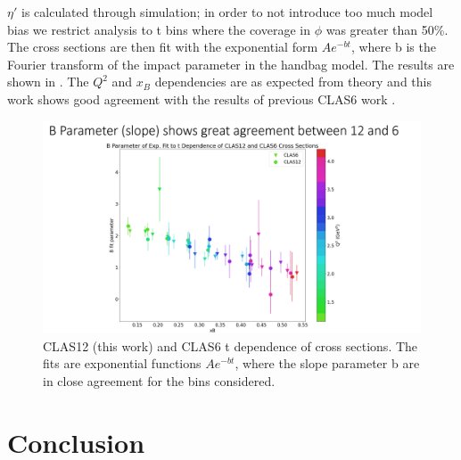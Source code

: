     $\eta'$ is calculated through simulation; in order to not introduce too much model bias we restrict analysis to t bins where the coverage in $\phi$ was greater than 50\%. The cross sections are then fit with the exponential form $Ae^{-bt}$, where b is the Fourier transform of the impact parameter in the handbag model. The results are shown in . The $Q^2$ and $x_B$ dependencies are as expected from theory and this work shows good agreement with the results of previous CLAS6 work \parencite{Bedlinskiy2014ExclusiveCLAS}. %

    \begin{figure}[hbt]
    	\centering
    	\includegraphics[trim={0 0 0 2.1cm},clip,width=0.8\linewidth]{Chapters/Ch5-Further/t_dependence/pics/bslopes.png}
    
    	\caption[Impact Parameter B]{CLAS12 (this work) and CLAS6 \parencite{Bedlinskiy2014ExclusiveCLAS} t dependence of cross sections. The fits are exponential functions $Ae^{-bt}$, where the slope parameter b are in close agreement for the bins considered.}
    	\label{fig:bslopes}
    \end{figure}
    

    


%    

\clearpage
\section{Conclusion}

